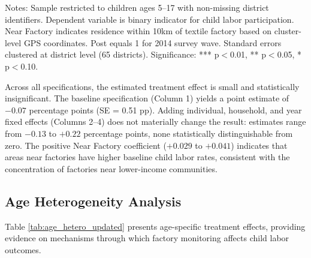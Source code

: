 \documentclass[12pt]{article}
\begin{document}
\begin{table}[H]
\begin{threeparttable}
\begin{tabular}{lcccc}
\end{tabular}
\begin{tablenotes}
\footnotesize
\item Notes: Sample restricted to children ages 5--17 with non-missing district identifiers. Dependent variable is binary indicator for child labor participation. Near Factory indicates residence within 10km of textile factory based on cluster-level GPS coordinates. Post equals 1 for 2014 survey wave. Standard errors clustered at district level (65 districts). Significance: *** p$<$0.01, ** p$<$0.05, * p$<$0.10.
\end{tablenotes}
\end{threeparttable}
\end{table}

Across all specifications, the estimated treatment effect is small and statistically insignificant. The baseline specification (Column 1) yields a point estimate of $-0.07$ percentage points (SE = 0.51 pp). Adding individual, household, and year fixed effects (Columns 2--4) does not materially change the result: estimates range from $-0.13$ to $+0.22$ percentage points, none statistically distinguishable from zero. The positive Near Factory coefficient ($+0.029$ to $+0.041$) indicates that areas near factories have higher baseline child labor rates, consistent with the concentration of factories near lower-income communities.

\subsection{Age Heterogeneity Analysis}

Table \ref{tab:age_hetero_updated} presents age-specific treatment effects, providing evidence on mechanisms through which factory monitoring affects child labor outcomes.
\end{document}

